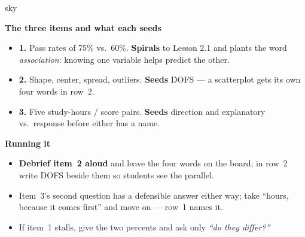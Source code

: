 \documentclass[10pt]{article}
\begin{document}
\boxguard[20]
\begin{skillbox}{sky}
\begin{minipage}[t]{0.48\linewidth}
    \textbf{The three items and what each seeds}
    \begin{itemize}
        \item \textbf{1.} Pass rates of 75\% vs.\ 60\%. \textbf{Spirals} to Lesson 2.1 and plants
              the word \emph{association}: knowing one variable helps predict the other.
        \item \textbf{2.} Shape, center, spread, outliers. \textbf{Seeds} DOFS --- a scatterplot
              gets its own four words in row~2.
        \item \textbf{3.} Five study-hours / score pairs. \textbf{Seeds} direction and
              explanatory vs.\ response before either has a name.
    \end{itemize}
\end{minipage}
\hfill
\begin{minipage}[t]{0.48\linewidth}
    \textbf{Running it}
    \begin{itemize}
        \item \textbf{Debrief item~2 aloud} and leave the four words on the board; in row~2
              write DOFS beside them so students see the parallel.
        \item Item~3's second question has a defensible answer either way; take ``hours,
              because it comes first'' and move on --- row~1 names it.
        \item If item~1 stalls, give the two percents and ask only \emph{``do they differ?''}
    \end{itemize}
\end{minipage}
\end{skillbox}
\end{document}
